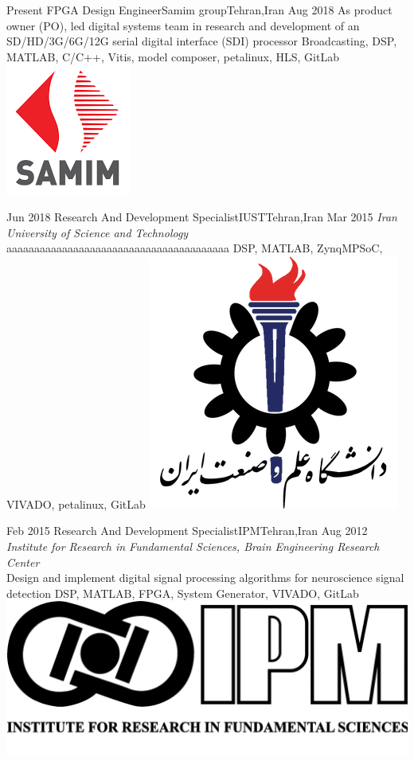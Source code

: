 
\begin{experiences}

  \experience
  {Present} {FPGA Design Engineer}{Samim group}{Tehran,Iran}
  {Aug 2018} {
    As product owner (PO), led digital systems team in research and development of an
    SD/HD/3G/6G/12G serial digital interface (SDI) processor
  }
  {Broadcasting, DSP, MATLAB, C/C++, Vitis, model composer, petalinux, HLS, GitLab}
  {\includegraphics[scale=0.2]{graphics/samim_logo}}

  \emptySeparator

  \experience
  {Jun 2018} {Research And Development Specialist}{IUST}{Tehran,Iran}
  {Mar 2015} {
    \emph{Iran University of Science and Technology}
    \\ aaaaaaaaaaaaaaaaaaaaaaaaaaaaaaaaaaaaaaaa
  }
  {DSP, MATLAB, ZynqMPSoC, VIVADO, petalinux, GitLab}
  {\includegraphics[scale=0.12]{graphics/IUST_logo_color}}

  \emptySeparator

  \experience
  {Feb 2015} {Research And Development Specialist}{IPM}{Tehran,Iran}
  {Aug 2012} {
    \emph{Institute for Research in Fundamental Sciences, Brain Engineering Research Center}\\
    Design and implement digital signal processing algorithms for neuroscience signal detection
  }
  {DSP, MATLAB, FPGA, System Generator, VIVADO, GitLab}
  {\includegraphics[scale=0.025]{graphics/IPM_logo}}


\end{experiences}
